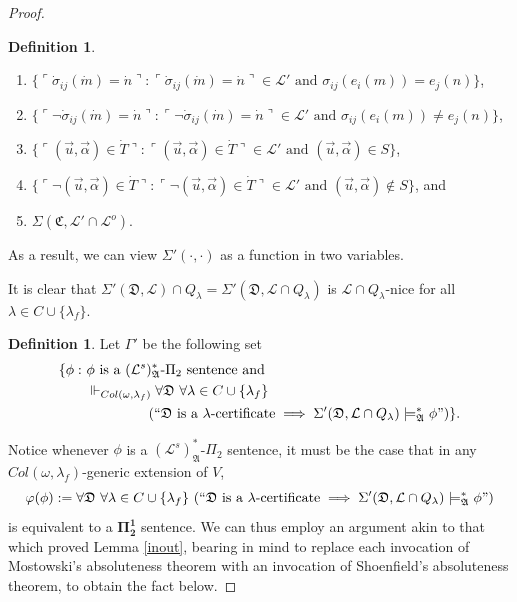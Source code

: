 \documentclass[12pt, twoside]{memoir}
\numberwithin{equation}{section}
\theoremstyle{definition}
\newtheorem{defi}[thm]{Definition}
\theoremstyle{remark}
\theoremstyle{definition}
\theoremstyle{definition}
\theoremstyle{definition}
\theoremstyle{remark}
\begin{document}
\begin{proof}
\begin{defi}
\begin{enumerate}[label=(\alph*)]
    \item $\{\ulcorner \dot{\sigma}_{ij}(\dot{m}) = \dot{n} \urcorner : \ulcorner \dot{\sigma}_{ij}(\dot{m}) = \dot{n} \urcorner \in \mathcal{L}' \text{ and } \sigma_{ij}(e_i(m)) = e_j(n)\}$,
    \item $\{\ulcorner \neg \dot{\sigma}_{ij}(\dot{m}) = \dot{n} \urcorner : \ulcorner \neg \dot{\sigma}_{ij}(\dot{m}) = \dot{n} \urcorner \in \mathcal{L}' \text{ and } \sigma_{ij}(e_i(m)) \neq e_j(n)\}$,
    \item $\{\ulcorner (\Vec{u}, \Vec{\alpha}) \in \dot{T} \urcorner : \ulcorner (\Vec{u}, \Vec{\alpha}) \in \dot{T} \urcorner \in \mathcal{L}' \text{ and } (\Vec{u}, \Vec{\alpha}) \in S\}$,
    \item $\{\ulcorner \neg (\Vec{u}, \Vec{\alpha}) \in \dot{T} \urcorner : \ulcorner \neg (\Vec{u}, \Vec{\alpha}) \in \dot{T} \urcorner \in \mathcal{L}' \text{ and } (\Vec{u}, \Vec{\alpha}) \not\in S\}$, and
    \item $\Sigma(\mathfrak{C}, \mathcal{L}' \cap \mathcal{L}^o)$.
\end{enumerate}
As a result, we can view $\Sigma'(\cdot, \cdot)$ as a function in two variables.
\end{defi}

It is clear that $\Sigma'(\mathfrak{D}, \mathcal{L}) \cap Q_{\lambda} = \Sigma'(\mathfrak{D}, \mathcal{L} \cap Q_{\lambda})$ is $\mathcal{L} \cap Q_{\lambda}$-nice for all $\lambda \in C \cup \{\lambda_f\}$.

\begin{defi}
Let $\Gamma'$ be the following set
\begin{align*}
    \{\phi : \ & \phi \text{ is a } (\mathcal{L}^s)^*_{\mathfrak{A}}\text{-}\Pi_2 \text{ sentence and} \\
    & \Vdash_{Col(\omega, \lambda_f)} \forall \mathfrak{D} \ \forall \lambda \in C \cup \{\lambda_f\} \\
    & \mspace{80mu} (``\mathfrak{D} \text{ is a } \lambda \text{-certificate} \implies \Sigma'(\mathfrak{D}, \mathcal{L} \cap Q_{\lambda}) \models^*_{\mathfrak{A}} \phi")\} \text{.}
\end{align*}
\end{defi}

Notice whenever $\phi$ is a $(\mathcal{L}^s)^*_{\mathfrak{A}}$-$\Pi_2$ sentence, it must be the case that in any $Col(\omega, \lambda_f)$-generic extension of $V$, 
\begin{equation*}
    \varphi(\phi) := \forall \mathfrak{D} \ \forall \lambda \in C \cup \{\lambda_f\} \ (``\mathfrak{D} \text{ is a } \lambda \text{-certificate} \implies \Sigma'(\mathfrak{D}, \mathcal{L} \cap Q_{\lambda}) \models^*_{\mathfrak{A}} \phi")
\end{equation*}
is equivalent to a $\mathbf{\Pi^1_2}$ sentence. We can thus employ an argument akin to that which proved Lemma \ref{inout}, bearing in mind to replace each invocation of Mostowski's absoluteness theorem with an invocation of Shoenfield's absoluteness theorem, to obtain the fact below.


\end{proof}
\end{document}
